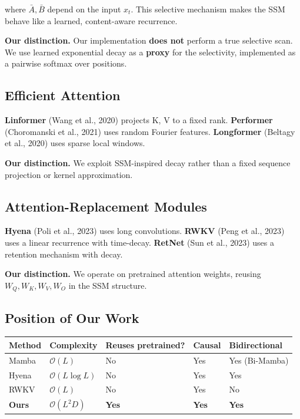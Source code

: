 where $\bar{A}, \bar{B}$ depend on the input $x_t$. This selective mechanism 
makes the SSM behave like a learned, content-aware recurrence.

\textbf{Our distinction.} Our implementation \textbf{does not} perform a true selective 
scan. We use learned exponential decay as a \textbf{proxy} for the selectivity, 
implemented as a pairwise softmax over positions.

\subsection{Efficient Attention}

\textbf{Linformer} (Wang et al., 2020) projects K, V to a fixed rank. 
\textbf{Performer} (Choromanski et al., 2021) uses random Fourier features. 
\textbf{Longformer} (Beltagy et al., 2020) uses sparse local windows.

\textbf{Our distinction.} We exploit SSM-inspired decay rather than a fixed 
sequence projection or kernel approximation.

\subsection{Attention-Replacement Modules}

\textbf{Hyena} (Poli et al., 2023) uses long convolutions. \textbf{RWKV} (Peng et al., 
2023) uses a linear recurrence with time-decay. \textbf{RetNet} (Sun et al., 2023) 
uses a retention mechanism with decay.

\textbf{Our distinction.} We operate on pretrained attention weights, reusing 
$W_Q, W_K, W_V, W_O$ in the SSM structure.

\subsection{Position of Our Work}

\begin{table}[H]
\centering
\small
\begin{tabular}{lllll}
\toprule
\textbf{Method} & \textbf{Complexity} & \textbf{Reuses pretrained?} & \textbf{Causal} & \textbf{Bidirectional} \\
\midrule
Mamba & $\mathcal{O}(L)$ & No & Yes & Yes (Bi-Mamba) \\
Hyena & $\mathcal{O}(L \log L)$ & No & Yes & Yes \\
RWKV & $\mathcal{O}(L)$ & No & Yes & No \\
\textbf{Ours} & \textbf{$\mathcal{O}(L^2 D)$} & \textbf{Yes} & \textbf{Yes} & \textbf{Yes} \\
\bottomrule
\end{tabular}
\end{table}

